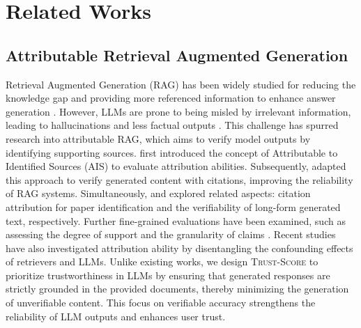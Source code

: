 \documentclass{article} %
\renewcommand{\cite}[1]{\citep{#1}}
\newcommand{\metric}[0]{\textsc{Trust-Score}}
\begin{document}
\section{Related Works}\label{sec:related_work}
\subsection{Attributable Retrieval Augmented Generation}
Retrieval Augmented Generation (RAG) has been widely studied for reducing the knowledge gap and providing more referenced information to enhance answer generation \cite{karpukhin-etal-2020-dense, lewis2021retrievalaugmented, gao2023retrieval}. However, LLMs are prone to being misled by irrelevant information, leading to hallucinations and less factual outputs \cite{pmlr-v202-shi23a, yoran2024makingretrievalaugmentedlanguagemodels, xu2023recompimprovingretrievalaugmentedlms}. This challenge has spurred research into attributable RAG, which aims to verify model outputs by identifying supporting sources. \citet{rashkin2022measuringattributionnaturallanguage} first introduced the concept of Attributable to Identified Sources (AIS) to evaluate attribution abilities. Subsequently, \citet{gao2023enabling} adapted this approach to verify generated content with citations, improving the reliability of RAG systems. Simultaneously, \citet{press2024citemelanguagemodelsaccurately} and \citet{song2024veriscoreevaluatingfactualityverifiable} explored related aspects: citation attribution for paper identification and the verifiability of long-form generated text, respectively. Further fine-grained evaluations have been examined, such as assessing the degree of support \cite{zhang2024finegrainedcitationevaluationgenerated} and the granularity of claims \cite{xu2024aliiceevaluatingpositionalfinegrained}. Recent studies \cite{buchmann2024attributeabstainlargelanguage, hsu2024calmcontrastinglargesmall} have also investigated attribution ability by disentangling the confounding effects of retrievers and LLMs. Unlike existing works, we design \metric{} to prioritize trustworthiness in LLMs by ensuring that generated responses are strictly grounded in the provided documents, thereby minimizing the generation of unverifiable content. This focus on verifiable accuracy strengthens the reliability of LLM outputs and enhances user trust.
\end{document}
